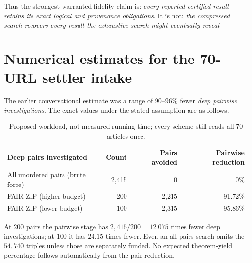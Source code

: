 \documentclass[11pt,letterpaper]{article}
\begin{document}
Thus the strongest warranted fidelity claim is: \emph{every reported certified result retains its exact logical and provenance obligations}. It is not: \emph{the compressed search recovers every result the exhaustive search might eventually reveal}.

\section{Numerical estimates for the 70-URL settler intake}
The earlier conversational estimate was a range of 90--96\% fewer \emph{deep pairwise investigations}. The exact values under the stated assumption are as follows.
\begin{table}[h!]
\centering
\small
\begin{tabularx}{\linewidth}{>{\raggedright\arraybackslash}X r r r}
\toprule
Deep pairs investigated & Count & Pairs avoided & Pairwise reduction\\
\midrule
All unordered pairs (brute force) & 2,415 & 0 & 0\%\\
FAIR-ZIP (higher budget) & 200 & 2,215 & 91.72\%\\
FAIR-ZIP (lower budget) & 100 & 2,315 & 95.86\%\\
\bottomrule
\end{tabularx}
\caption{Proposed workload, not measured running time; every scheme still reads all 70 articles once.}
\end{table}
At 200 pairs the pairwise stage has $2,415/200=12.075$ times fewer deep investigations; at 100 it has $24.15$ times fewer. Even an all-pairs search omits the $54,740$ triples unless those are separately funded. No expected theorem-yield percentage follows automatically from the pair reduction.
\end{document}
